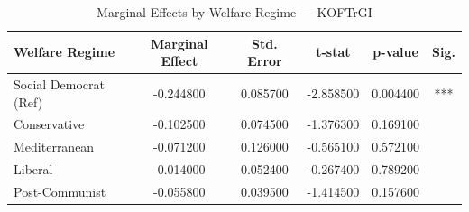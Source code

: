 \begin{table}[htbp]
\caption{Marginal Effects by Welfare Regime — KOFTrGI}
\label{tab:marginal_effects_KOFTrGI}
\begin{tabular}{lccccc}
\toprule
Welfare Regime & Marginal Effect & Std. Error & t-stat & p-value & Sig. \\
\midrule
Social Democrat (Ref) & -0.244800 & 0.085700 & -2.858500 & 0.004400 & *** \\
Conservative & -0.102500 & 0.074500 & -1.376300 & 0.169100 &  \\
Mediterranean & -0.071200 & 0.126000 & -0.565100 & 0.572100 &  \\
Liberal & -0.014000 & 0.052400 & -0.267400 & 0.789200 &  \\
Post-Communist & -0.055800 & 0.039500 & -1.414500 & 0.157600 &  \\
\bottomrule
\end{tabular}
\end{table}
